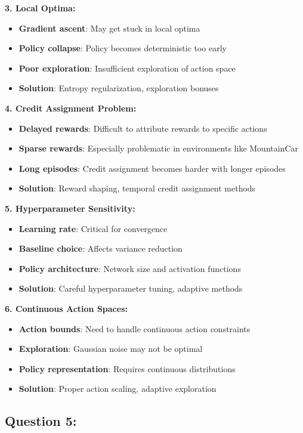 \documentclass[12pt]{article}
\begin{document}
{{{\textbf{3. Local Optima:}
\begin{itemize}
    \item \textbf{Gradient ascent}: May get stuck in local optima
    \item \textbf{Policy collapse}: Policy becomes deterministic too early
    \item \textbf{Poor exploration}: Insufficient exploration of action space
    \item \textbf{Solution}: Entropy regularization, exploration bonuses
\end{itemize}

\textbf{4. Credit Assignment Problem:}
\begin{itemize}
    \item \textbf{Delayed rewards}: Difficult to attribute rewards to specific actions
    \item \textbf{Sparse rewards}: Especially problematic in environments like MountainCar
    \item \textbf{Long episodes}: Credit assignment becomes harder with longer episodes
    \item \textbf{Solution}: Reward shaping, temporal credit assignment methods
\end{itemize}

\textbf{5. Hyperparameter Sensitivity:}
\begin{itemize}
    \item \textbf{Learning rate}: Critical for convergence
    \item \textbf{Baseline choice}: Affects variance reduction
    \item \textbf{Policy architecture}: Network size and activation functions
    \item \textbf{Solution}: Careful hyperparameter tuning, adaptive methods
\end{itemize}

\textbf{6. Continuous Action Spaces:}
\begin{itemize}
    \item \textbf{Action bounds}: Need to handle continuous action constraints
    \item \textbf{Exploration}: Gaussian noise may not be optimal
    \item \textbf{Policy representation}: Requires continuous distributions
    \item \textbf{Solution}: Proper action scaling, adaptive exploration
\end{itemize}

\subsection{Question 5:}

}}}
\end{document}
